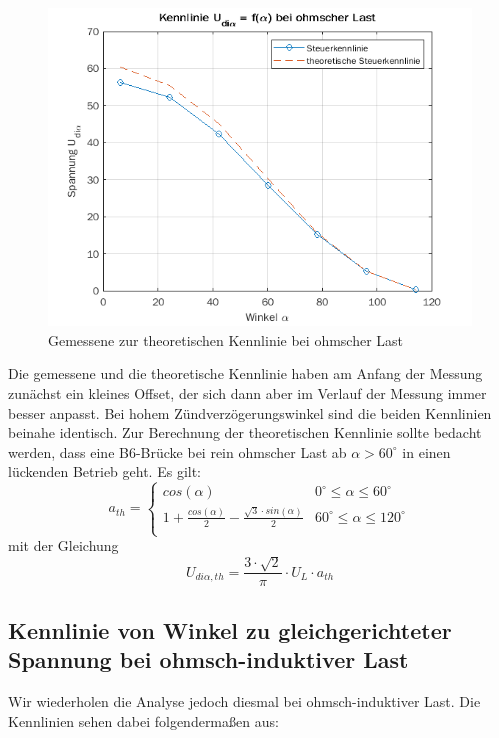 \documentclass{article}
\begin{document}
\begin{figure}[h]
  \centering
  \includegraphics[width=\textwidth]{../assets/images/GEP2/udia_alpha_ohm.png}
  \caption{Gemessene zur theoretischen Kennlinie bei ohmscher Last}
  \label{fig:udiaalphaohm}
\end{figure}
Die gemessene und die theoretische Kennlinie haben am Anfang der Messung zunächst ein kleines Offset, der sich dann aber im Verlauf der Messung immer besser anpasst. Bei hohem Zündverzögerungswinkel sind die beiden Kennlinien beinahe identisch.
Zur Berechnung der theoretischen Kennlinie sollte bedacht werden, dass eine B6-Brücke bei rein ohmscher Last ab $\alpha > 60^{\circ}$ in einen lückenden Betrieb geht. Es gilt:
\begin{equation*}
  a_{th} = \begin{cases}
    cos(\alpha) & 0^{\circ}\leq\alpha\leq 60^{\circ}\\
    1 + \frac{cos(\alpha)}{2} - \frac{\sqrt{3}\cdot sin(\alpha)}{2} & 60^{\circ}\leq\alpha\leq 120^{\circ}\\
  \end{cases}
\end{equation*}
mit der Gleichung
\begin{equation}
  \label{eq:3}
  U_{di\alpha, th} = \frac{3\cdot\sqrt{2}}{\pi}\cdot U_{L}\cdot a_{th}
\end{equation}


\subsection{Kennlinie von Winkel zu gleichgerichteter Spannung bei ohmsch-induktiver Last}
\label{sec:kennlinie-von-winkel-1}
Wir wiederholen die Analyse jedoch diesmal bei ohmsch-induktiver Last. Die Kennlinien sehen dabei folgendermaßen aus:
\end{document}
